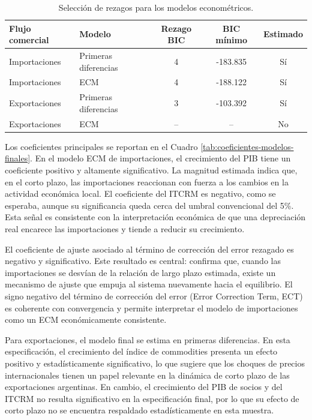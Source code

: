 \documentclass[11pt]{article}
\begin{document}
\begin{table}[H]
\centering
\caption{Selección de rezagos para los modelos econométricos.}
\label{tab:seleccion-rezagos}
\small
\begin{tabular}{llccc}
\toprule
Flujo comercial & Modelo & Rezago BIC & BIC mínimo & Estimado \\
\midrule
Importaciones & Primeras diferencias & 4 & -183.835 & Sí \\
Importaciones & ECM & 4 & -188.122 & Sí \\
Exportaciones & Primeras diferencias & 3 & -103.392 & Sí \\
Exportaciones & ECM & -- & -- & No \\
\bottomrule
\end{tabular}
\end{table}

Los coeficientes principales se reportan en el Cuadro
\ref{tab:coeficientes-modelos-finales}. En el modelo ECM de importaciones, el
crecimiento del PIB tiene un coeficiente positivo y altamente significativo. La
magnitud estimada indica que, en el corto plazo, las importaciones reaccionan
con fuerza a los cambios en la actividad económica local. El coeficiente del
ITCRM es negativo, como se esperaba, aunque su significancia queda cerca del
umbral convencional del 5\%. Esta señal es consistente con la interpretación
económica de que una depreciación real encarece las importaciones y tiende a
reducir su crecimiento.

El coeficiente de ajuste asociado al término de corrección del error rezagado
es negativo y significativo. Este resultado es central: confirma que, cuando
las importaciones se desvían de la relación de largo plazo estimada, existe un
mecanismo de ajuste que empuja al sistema nuevamente hacia el equilibrio. El
signo negativo del término de corrección del error (Error Correction Term, ECT)
es coherente con convergencia y permite interpretar el modelo de importaciones
como un ECM económicamente consistente.

Para exportaciones, el modelo final se estima en primeras diferencias. En esta
especificación, el crecimiento del índice de commodities presenta un efecto
positivo y estadísticamente significativo, lo que sugiere que los choques de
precios internacionales tienen un papel relevante en la dinámica de corto plazo
de las exportaciones argentinas. En cambio, el crecimiento del PIB de socios y
del ITCRM no resulta significativo en la especificación final, por lo que su
efecto de corto plazo no se encuentra respaldado estadísticamente en esta
muestra.
\end{document}
